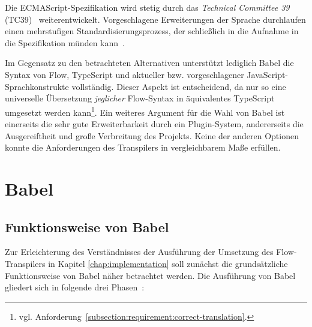 


Die ECMAScript-Spezifikation wird stetig durch das \textit{Technical Committee 39} (TC39)~\autocite{TC39_COMMITTEE} weiterentwickelt. Vorgeschlagene Erweiterungen der Sprache durchlaufen einen mehrstufigen Standardisierungsprozess, der schließlich in die Aufnahme in die Spezifikation münden kann~\autocite{TC39_PROCESS}.

Im Gegensatz zu den betrachteten Alternativen unterstützt lediglich Babel die Syntax von Flow, TypeScript und aktueller bzw. vorgeschlagener JavaScript-Sprachkonstrukte vollständig. Dieser Aspekt ist entscheidend, da nur so eine universelle Übersetzung \emph{jeglicher} Flow-Syntax in äquivalentes TypeScript umgesetzt werden kann\footnote{vgl. Anforderung~\ref{subsection:requirement:correct-translation}.}.
Ein weiteres Argument für die Wahl von Babel ist einerseits die sehr gute Erweiterbarkeit durch ein Plugin-System, andererseits die Ausgereiftheit und große Verbreitung des Projekts. Keine der anderen Optionen konnte die Anforderungen des Transpilers in vergleichbarem Maße erfüllen.

\section{Babel}
\label{sec:babel}

\subsection{Funktionsweise von Babel}

Zur Erleichterung des Verständnisses der Ausführung der Umsetzung des Flow-Transpilers in Kapitel \ref{chap:implementation} soll zunächst die grundsätzliche Funktionsweise von Babel näher betrachtet werden. Die Ausführung von Babel gliedert sich in folgende drei Phasen~\autocite{BABEL:HANDBOOK}:


